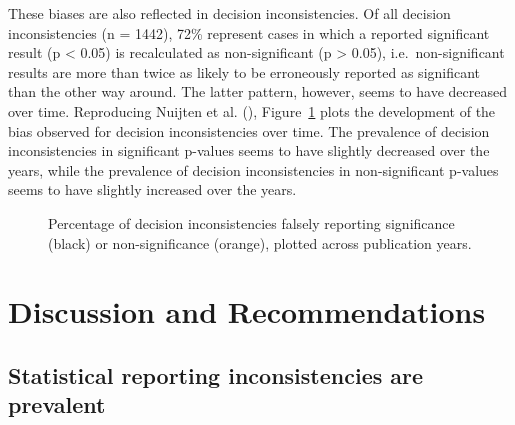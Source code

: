 \documentclass[
  doc,
  longtable,
  nolmodern,
  notxfonts,
  notimes,
  colorlinks=true,linkcolor=blue,citecolor=blue,urlcolor=blue]{apa7}
\begin{document}
These biases are also reflected in decision inconsistencies. Of all
decision inconsistencies (n = 1442), 72\% represent cases in which a
reported significant result (p \textless{} 0.05) is recalculated as
non-significant (p \textgreater{} 0.05), i.e.~non-significant results
are more than twice as likely to be erroneously reported as significant
than the other way around. The latter pattern, however, seems to have
decreased over time. Reproducing Nuijten et al.
(), Figure~\ref{fig-scatter}
plots the development of the bias observed for decision inconsistencies
over time. The prevalence of decision inconsistencies in significant
p-values seems to have slightly decreased over the years, while the
prevalence of decision inconsistencies in non-significant p-values seems
to have slightly increased over the years.

\begin{figure}

\caption{\label{fig-scatter}Percentage of decision inconsistencies
falsely reporting significance (black) or non-significance (orange),
plotted across publication years.}


\end{figure}%

\section{Discussion and
Recommendations}\label{discussion-and-recommendations}

\subsection{Statistical reporting inconsistencies are
prevalent}\label{statistical-reporting-inconsistencies-are-prevalent}
\end{document}
